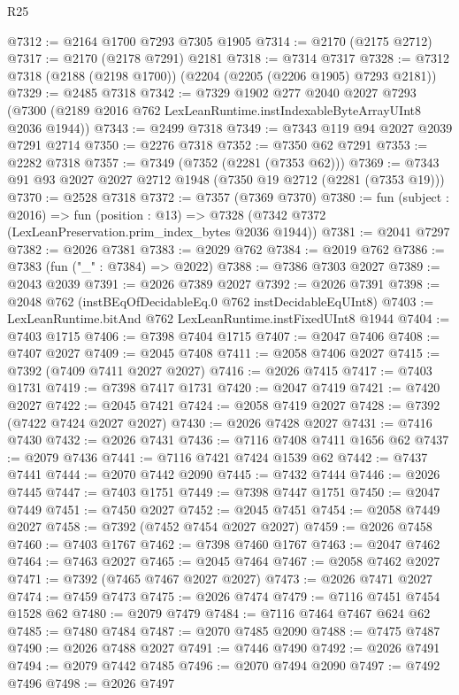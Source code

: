 \begin{lexlean}{R25}
\begin{coremodule}
@7312 := @2164 @1700 @7293 @7305 @1905
@7314 := @2170 (@2175 @2712)
@7317 := @2170 (@2178 @7291) @2181
@7318 := @7314 @7317
@7328 := @7312 @7318 (@2188 (@2198 @1700)) (@2204 (@2205 (@2206 @1905) @7293 @2181))
@7329 := @2485 @7318
@7342 := @7329
    @1902
    @277
    @2040
    @2027
    @7293
    (@7300 (@2189 @2016 @762 LexLeanRuntime.instIndexableByteArrayUInt8 @2036 @1944))
@7343 := @2499 @7318
@7349 := @7343 @119 @94 @2027 @2039 @7291 @2714
@7350 := @2276 @7318
@7352 := @7350 @62 @7291
@7353 := @2282 @7318
@7357 := @7349 (@7352 (@2281 (@7353 @62)))
@7369 := @7343 @91 @93 @2027 @2027 @2712 @1948 (@7350 @19 @2712 (@2281 (@7353 @19)))
@7370 := @2528 @7318
@7372 := @7357 (@7369 @7370)
@7380 := fun (subject : @2016) =>
  fun (position : @13) => @7328 (@7342 @7372 (LexLeanPreservation.prim_index_bytes @2036 @1944))
@7381 := @2041 @7297
@7382 := @2026 @7381
@7383 := @2029 @762
@7384 := @2019 @762
@7386 := @7383 (fun ("_" : @7384) => @2022)
@7388 := @7386 @7303 @2027
@7389 := @2043 @2039
@7391 := @2026 @7389 @2027
@7392 := @2026 @7391
@7398 := @2048 @762 (instBEqOfDecidableEq.{0} @762 instDecidableEqUInt8)
@7403 := LexLeanRuntime.bitAnd @762 LexLeanRuntime.instFixedUInt8 @1944
@7404 := @7403 @1715
@7406 := @7398 @7404 @1715
@7407 := @2047 @7406
@7408 := @7407 @2027
@7409 := @2045 @7408
@7411 := @2058 @7406 @2027
@7415 := @7392 (@7409 @7411 @2027 @2027)
@7416 := @2026 @7415
@7417 := @7403 @1731
@7419 := @7398 @7417 @1731
@7420 := @2047 @7419
@7421 := @7420 @2027
@7422 := @2045 @7421
@7424 := @2058 @7419 @2027
@7428 := @7392 (@7422 @7424 @2027 @2027)
@7430 := @2026 @7428 @2027
@7431 := @7416 @7430
@7432 := @2026 @7431
@7436 := @7116 @7408 @7411 @1656 @62
@7437 := @2079 @7436
@7441 := @7116 @7421 @7424 @1539 @62
@7442 := @7437 @7441
@7444 := @2070 @7442 @2090
@7445 := @7432 @7444
@7446 := @2026 @7445
@7447 := @7403 @1751
@7449 := @7398 @7447 @1751
@7450 := @2047 @7449
@7451 := @7450 @2027
@7452 := @2045 @7451
@7454 := @2058 @7449 @2027
@7458 := @7392 (@7452 @7454 @2027 @2027)
@7459 := @2026 @7458
@7460 := @7403 @1767
@7462 := @7398 @7460 @1767
@7463 := @2047 @7462
@7464 := @7463 @2027
@7465 := @2045 @7464
@7467 := @2058 @7462 @2027
@7471 := @7392 (@7465 @7467 @2027 @2027)
@7473 := @2026 @7471 @2027
@7474 := @7459 @7473
@7475 := @2026 @7474
@7479 := @7116 @7451 @7454 @1528 @62
@7480 := @2079 @7479
@7484 := @7116 @7464 @7467 @624 @62
@7485 := @7480 @7484
@7487 := @2070 @7485 @2090
@7488 := @7475 @7487
@7490 := @2026 @7488 @2027
@7491 := @7446 @7490
@7492 := @2026 @7491
@7494 := @2079 @7442 @7485
@7496 := @2070 @7494 @2090
@7497 := @7492 @7496
@7498 := @2026 @7497

\end{coremodule}
\end{lexlean}
